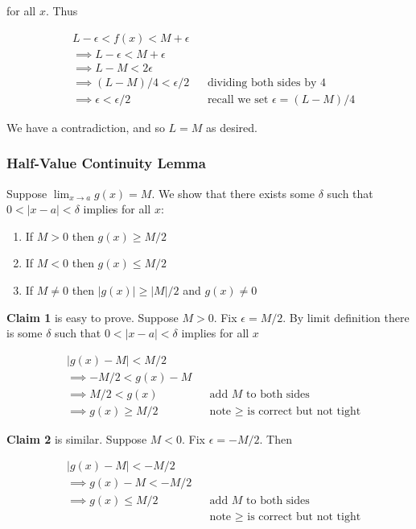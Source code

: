 for all $x$. Thus

\begin{align*}
    &L-\epsilon<f(x)<M+\epsilon\\
    &\implies L-\epsilon<M+\epsilon\\
    &\implies L-M<2\epsilon\\
    &\implies (L-M)/4<\epsilon/2&&\text{dividing both sides by 4}\\
    &\implies \epsilon<\epsilon/2&&\text{recall we set $\epsilon=(L-M)/4$}
\end{align*}

We have a contradiction, and so $L=M$ as desired.

\subsubsection*{Half-Value Continuity Lemma}

Suppose $\lim_{x\to a}g(x)=M$. We show that there exists some $\delta$ such
that $0<|x-a|<\delta$ implies for all $x$:

\begin{enumerate}
    \item If $M>0$ then $g(x)\geq M/2$
    \item If $M<0$ then $g(x)\leq M/2$
    \item If $M\neq 0$ then $|g(x)|\geq|M|/2$ and $g(x)\neq 0$
\end{enumerate}

\textbf{Claim 1} is easy to prove. Suppose $M>0$. Fix $\epsilon=M/2$. By
limit definition there is some $\delta$ such that $0<|x-a|<\delta$ implies for
all $x$

\begin{align*}
    &|g(x)-M|<M/2\\
    &\implies -M/2<g(x)-M\\
    &\implies M/2<g(x)&&\text{add $M$ to both sides}\\
    &\implies g(x)\geq M/2&&\text{note $\geq$ is correct but not tight}
\end{align*}

\textbf{Claim 2} is similar. Suppose $M<0$. Fix $\epsilon=-M/2$. Then

\begin{align*}
    &|g(x)-M|<-M/2\\
    &\implies g(x)-M<-M/2\\
    &\implies g(x)\leq M/2&&\text{add $M$ to both sides}\\
    & &&\text{note $\geq$ is correct but not tight}
\end{align*}

